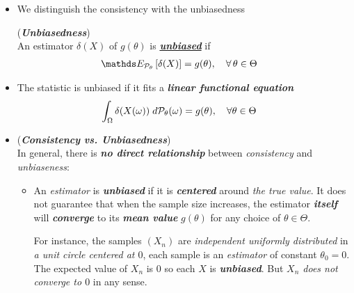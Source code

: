 \documentclass[11pt]{article}
\begin{document}
\begin{itemize}
\item We distinguish the consistency with the unbiasedness
\begin{definition} (\textbf{\emph{Unbiasedness}})\\
An estimator $\delta(X)$ of $g(\theta)$ is \underline{\emph{\textbf{unbiased}}} if 
\begin{align*}
\E{\cP_{\theta}}{\delta(X)} &= g(\theta),\quad \forall\, \theta\in \Theta 
\end{align*}
\end{definition}

\item \begin{remark}
The  statistic is unbiased if it fits a \emph{\textbf{linear functional equation}}
\begin{align*}
\int_{\Omega} \delta(X(\omega)) \;d{\mathcal P}_{\theta}(\omega) &= g(\theta), \quad \forall \theta\in \Theta
\end{align*}
\end{remark}

%

\item \begin{remark} (\emph{\textbf{Consistency vs. Unbiasedness}})\\
In general, there is \emph{\textbf{no direct relationship}} between \emph{consistency} and \emph{unbiaseness}:
\begin{itemize}
\item An \emph{estimator} is \emph{\textbf{unbiased}} if it is \emph{\textbf{centered}} around \emph{the true value}. 
It does not guarantee that when the sample size increases, the estimator \emph{\textbf{itself}} will \emph{\textbf{converge}} to its \emph{\textbf{mean value}} $g(\theta)$ for any choice of $\theta \in \Theta$.  

For instance, the samples $(X_n)$ are \emph{independent uniformly distributed} in \emph{a unit circle centered at $0$}, each sample is an \emph{estimator} of constant $\theta_0 = 0$. The expected value of $X_n$ is $0$ so each $X$ is \emph{\textbf{unbiased}}. But \emph{$X_n$ does not converge to $0$} in any sense.


\end{itemize}
\end{remark}
\end{itemize}
\end{document}
